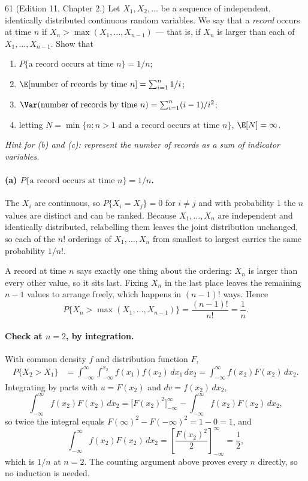 \documentclass[11pt]{article}
\begin{document}
\begin{problem}{61}
  (Edition 11, Chapter 2.) Let $X_1, X_2, \ldots$ be a sequence of independent,
  identically distributed continuous random variables. We say that a
  \emph{record} occurs at time $n$ if $X_n > \max(X_1, \ldots, X_{n-1})$ ---
  that is, if $X_n$ is larger than each of $X_1, \ldots, X_{n-1}$. Show that
  \begin{enumerate}
    \item $P\{\text{a record occurs at time } n\} = 1/n$;
    \item $\E[\text{number of records by time } n] = \sum_{i=1}^{n} 1/i$;
    \item $\Var(\text{number of records by time } n) = \sum_{i=1}^{n} (i-1)/i^2$;
    \item letting $N = \min\{n : n > 1 \text{ and a record occurs at time } n\}$,
          $\E[N] = \infty$.
  \end{enumerate}
  \emph{Hint for (b) and (c): represent the number of records as a sum of
  indicator variables.}
\end{problem}
\paragraph{(a) $P\{\text{a record occurs at time } n\} = 1/n$.}
The $X_i$ are continuous, so $P\{X_i = X_j\} = 0$ for $i \neq j$ and with
probability $1$ the $n$ values are distinct and can be ranked. Because
$X_1, \ldots, X_n$ are independent and identically distributed, relabelling
them leaves the joint distribution unchanged, so each of the $n!$ orderings of
$X_1, \ldots, X_n$ from smallest to largest carries the same probability
$1/n!$.

A record at time $n$ says exactly one thing about the ordering: $X_n$ is larger
than every other value, so it sits last. Fixing $X_n$ in the last place leaves
the remaining $n-1$ values to arrange freely, which happens in $(n-1)!$ ways.
Hence
\[
  P\{X_n > \max(X_1, \ldots, X_{n-1})\}
    = \frac{(n-1)!}{n!}
    = \frac{1}{n}.
\]

\paragraph{Check at $n = 2$, by integration.}
With common density $f$ and distribution function $F$,
\begin{align*}
  P\{X_2 > X_1\}
    &= \int_{-\infty}^{\infty}\!\int_{-\infty}^{x_2} f(x_1)f(x_2)\,dx_1\,dx_2
     = \int_{-\infty}^{\infty} f(x_2)F(x_2)\,dx_2 .
\end{align*}
Integrating by parts with $u = F(x_2)$ and $dv = f(x_2)\,dx_2$,
\[
  \int_{-\infty}^{\infty} f(x_2)F(x_2)\,dx_2
    = \Big[F(x_2)^{2}\Big]_{-\infty}^{\infty}
      - \int_{-\infty}^{\infty} f(x_2)F(x_2)\,dx_2 ,
\]
so twice the integral equals $F(\infty)^{2} - F(-\infty)^{2} = 1 - 0 = 1$, and
\[
  \int_{-\infty}^{\infty} f(x_2)F(x_2)\,dx_2
    = \left[\frac{F(x_2)^{2}}{2}\right]_{-\infty}^{\infty}
    = \frac{1}{2},
\]
which is $1/n$ at $n = 2$. The counting argument above proves every $n$
directly, so no induction is needed.
\end{document}
